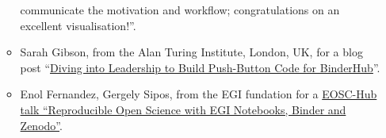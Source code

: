 \begin{enumerate}
\begin{itemize}
    communicate the motivation and workflow; congratulations on an
    excellent visualisation!''.
  \item Sarah Gibson, from the Alan Turing Institute, London, UK, for
    a blog post
    ``\href{https://blog.jupyter.org/diving-into-leadership-to-build-push-button-code-df2a075c9914}{Diving
      into Leadership to Build Push-Button Code for BinderHub}''.
  \item Enol Fernandez, Gergely Sipos, from the EGI fundation for a
    \href{https://www.slideshare.net/EGI_Foundation/reproducible-open-science-with-egi-notebooks-binder-and-zenodo}{EOSC-Hub talk ``Reproducible Open Science with EGI Notebooks, Binder and Zenodo''}.
  \end{itemize}
\end{enumerate}







